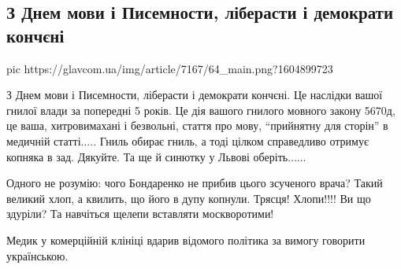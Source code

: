  
 
 

\subsection{З Днем мови і Писемности, ліберасти і демократи кончєні}

\ifcmt
pic https://glavcom.ua/img/article/7167/64_main.png?1604899723
\fi

З Днем мови і Писемности, ліберасти і демократи кончєні. Це наслідки вашої
гнилої влади за попередні 5 років. Це дія вашого гнилого мовного закону 5670д,
це ваша, хитровимахані і безвольні, стаття про мову, \enquote{прийнятну для сторін} в
медичній статті..... Гниль обирає гниль, а тоді цілком справедливо отримує
копняка в зад. Дякуйте. Та ще й синютку у Львові оберіть......

Одного не розумію: чого Бондаренко не прибив цього зсученого врача? Такий
великий хлоп, а квилить, що його в дупу копнули. Трясця! Хлопи!!!! Ви що
здуріли? Та навчіться щелепи вставляти москворотими!

Медик у комерційній клініці вдарив відомого політика за вимогу говорити
українською.
